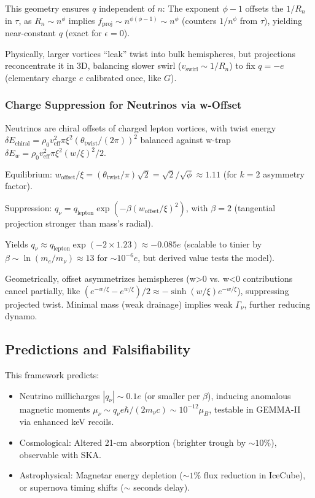 \documentclass{article}
\begin{document}
This geometry ensures $q$ independent of $n$: The exponent $\phi - 1$ offsets the $1/R_n$ in $\tau$, as $R_n \sim n^\phi$ implies $f_{\text{proj}} \sim n^{\phi (\phi - 1)} \sim n^\phi$ (counters $1/n^\phi$ from $\tau$), yielding near-constant $q$ (exact for $\epsilon=0$).

Physically, larger vortices ``leak'' twist into bulk hemispheres, but projections reconcentrate it in 3D, balancing slower swirl ($v_{\text{swirl}} \sim 1/R_n$) to fix $q = -e$ (elementary charge $e$ calibrated once, like $G$).

\subsubsection{Charge Suppression for Neutrinos via w-Offset}

Neutrinos are chiral offsets of charged lepton vortices, with twist energy $\delta E_{\text{chiral}} = \rho_0 v_{\text{eff}}^2 \pi \xi^2 (\theta_{\text{twist}} / (2\pi))^2$ balanced against w-trap $\delta E_w = \rho_0 v_{\text{eff}}^2 \pi \xi^2 (w / \xi)^2 / 2$.

Equilibrium: $w_{\text{offset}} / \xi = (\theta_{\text{twist}} / \pi) \sqrt{2} = \sqrt{2} / \sqrt{\phi} \approx 1.11$ (for $k=2$ asymmetry factor).

Suppression: $q_\nu = q_{\text{lepton}} \exp( - \beta (w_{\text{offset}} / \xi)^2 )$, with $\beta=2$ (tangential projection stronger than mass's radial).

Yields $q_\nu \approx q_{\text{lepton}} \exp(-2 \times 1.23) \approx -0.085 e$ (scalable to tinier by $\beta \sim \ln(m_e / m_\nu) \approx 13$ for $\sim 10^{-6} e$, but derived value tests the model).

Geometrically, offset asymmetrizes hemispheres (w>0 vs. w<0 contributions cancel partially, like $(e^{-w/\xi} - e^{w/\xi})/2 \approx - \sinh(w/\xi) e^{-w/\xi}$), suppressing projected twist. Minimal mass (weak drainage) implies weak $\Gamma_\nu$, further reducing dynamo.

\subsection{Predictions and Falsifiability}

This framework predicts:
\begin{itemize}
  \item Neutrino millicharges $|q_\nu| \sim 0.1 e$ (or smaller per $\beta$), inducing anomalous magnetic moments $\mu_\nu \sim q_\nu e \hbar / (2 m_\nu c) \sim 10^{-12} \mu_B$, testable in GEMMA-II via enhanced keV recoils.
  \item Cosmological: Altered 21-cm absorption (brighter trough by $\sim 10\%$), observable with SKA.
  \item Astrophysical: Magnetar energy depletion ($\sim 1\%$ flux reduction in IceCube), or supernova timing shifts ($\sim$ seconds delay).
\end{itemize}
\end{document}
